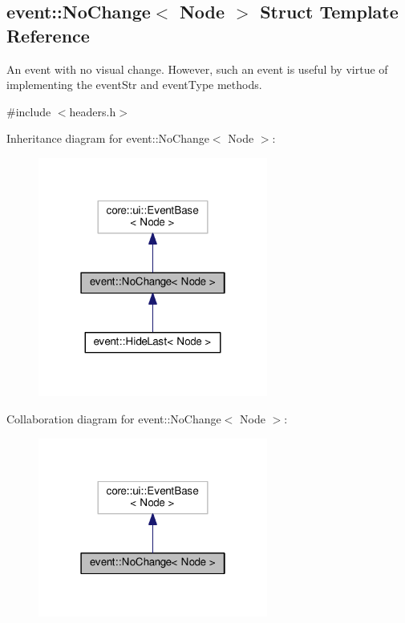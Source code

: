 \hypertarget{structevent_1_1NoChange}{}\subsection{event\+:\+:No\+Change$<$ Node $>$ Struct Template Reference}
\label{structevent_1_1NoChange}


An event with no visual change. However, such an event is useful by virtue of implementing the {\ttfamily event\+Str} and {\ttfamily event\+Type} methods.  




{\ttfamily \#include $<$headers.\+h$>$}



Inheritance diagram for event\+:\+:No\+Change$<$ Node $>$\+:\nopagebreak
\begin{figure}[H]
\begin{center}
\leavevmode
\includegraphics[width=214pt]{structevent_1_1NoChange__inherit__graph}
\end{center}
\end{figure}


Collaboration diagram for event\+:\+:No\+Change$<$ Node $>$\+:\nopagebreak
\begin{figure}[H]
\begin{center}
\leavevmode
\includegraphics[width=214pt]{structevent_1_1NoChange__coll__graph}
\end{center}
\end{figure}



